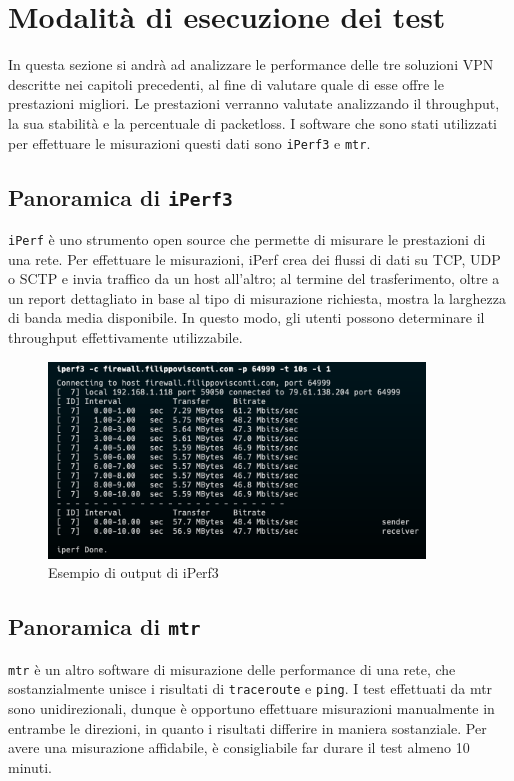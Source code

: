 \section{Modalità di esecuzione dei test}
In questa sezione si andrà ad analizzare le performance delle tre soluzioni VPN descritte nei capitoli precedenti, al fine di valutare quale di esse offre le prestazioni migliori.
Le prestazioni verranno valutate analizzando il throughput, la sua stabilità e la percentuale di packetloss.
I software che sono stati utilizzati per effettuare le misurazioni questi dati sono \texttt{iPerf3} e \texttt{mtr}.

\subsection{Panoramica di \texttt{iPerf3}}
\texttt{iPerf} è uno strumento open source che permette di misurare le prestazioni di una rete.
Per effettuare le misurazioni, iPerf crea dei flussi di dati su TCP, UDP o SCTP e invia traffico da un host all'altro; al termine del trasferimento, oltre a un report dettagliato in base al tipo di misurazione richiesta, mostra la larghezza di banda media disponibile.
In questo modo, gli utenti possono determinare il throughput effettivamente utilizzabile.

\begin{figure}[ht]
    \centering
    \includegraphics[width=10cm]{figure/iperfSample.png}
    \caption{Esempio di output di iPerf3}
\end{figure}

\subsection{Panoramica di \texttt{mtr}}
\texttt{mtr} è un altro software di misurazione delle performance di una rete, che sostanzialmente unisce i risultati di \texttt{traceroute} e \texttt{ping}.
I test effettuati da mtr sono unidirezionali, dunque è opportuno effettuare misurazioni manualmente in entrambe le direzioni, in quanto i risultati differire in maniera sostanziale. Per avere una misurazione affidabile, è consigliabile far durare il test almeno 10 minuti.

